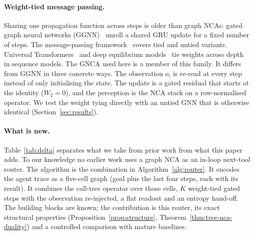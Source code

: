 \documentclass[10pt]{article}
\begin{document}
\paragraph{Weight-tied message passing.} Sharing one propagation function across steps is older than graph NCAs: gated graph neural networks (GGNN)~\citep{li2016ggnn} unroll a shared GRU update for a fixed number of steps. The message-passing framework~\citep{gilmer2017mpnn} covers tied and untied variants. Universal Transformers~\citep{dehghani2019universal} and deep equilibrium models~\citep{bai2019deq} tie weights across depth in sequence models. The GNCA used here is a member of this family. It differs from GGNN in three concrete ways. The observation $o_i$ is re-read at every step instead of only initialising the state. The update is a gated residual that starts at the identity ($W_2{=}0$), and the perception is the NCA stack on a row-normalised operator. We test the weight tying directly with an untied GNN that is otherwise identical (Section~\ref{sec:results}).
\paragraph{What is new.} Table~\ref{tab:delta} separates what we take from prior work from what this paper adds. To our knowledge no earlier work uses a graph NCA as an in-loop next-tool router. The algorithm is the combination in Algorithm~\ref{alg:router}. It encodes the agent trace as a five-cell graph (goal plus the last four steps, each with its result). It combines the call-tree operator over those cells, $K$ weight-tied gated steps with the observation re-injected, a flat readout and an entropy hand-off. The building blocks are known; the contribution is this router, its exact structural properties (Proposition~\ref{prop:structure}, Theorem~\ref{thm:tree-nca-duality}) and a controlled comparison with mature baselines.
\end{document}
